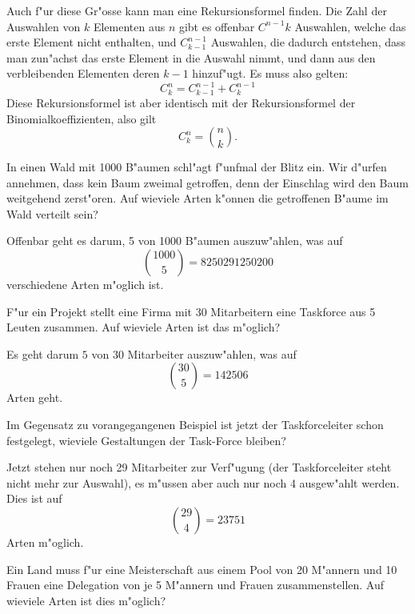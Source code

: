 Auch f"ur diese Gr"osse kann man eine Rekursionsformel finden.
Die Zahl der Auswahlen von $k$ Elementen aus $n$ gibt es
offenbar $C^{n-1}{k}$ Auswahlen, welche das erste Element nicht
enthalten, und $C^{n-1}_{k-1}$ Auswahlen, die dadurch entstehen,
dass man zun"achst das erste Element in die Auswahl nimmt, und dann
aus den verbleibenden Elementen deren $k-1$ hinzuf"ugt. Es muss also
gelten:
\[
C^n_k=C^{n-1}_{k-1}+C^{n-1}_{k}
\]
Diese Rekursionsformel ist aber identisch mit der Rekursionsformel
der Binomialkoeffizienten, also gilt
\[
C^n_k=\binom{n}{k}.
\]

\begin{beispiele}
\item In einen Wald mit 1000 B"aumen schl"agt f"unfmal der Blitz ein.
Wir d"urfen annehmen, dass kein Baum zweimal getroffen, denn der
Einschlag wird den Baum weitgehend zerst"oren. Auf wieviele Arten
k"onnen die getroffenen B"aume im Wald verteilt sein?

\begin{loesung}
Offenbar geht es darum, 5 von 1000 B"aumen auszuw"ahlen, was 
auf
\[
\binom{1000}{5}=8250291250200
\]
verschiedene Arten m"oglich ist.
\end{loesung}

\item F"ur ein Projekt stellt eine Firma mit 30 Mitarbeitern eine Taskforce
aus 5 Leuten zusammen. Auf wieviele Arten ist das m"oglich?


\begin{loesung}
Es geht darum $5$ von $30$ Mitarbeiter auszuw"ahlen, was auf
\[
\binom{30}{5}=142506
\]
Arten geht.
\end{loesung}

\item Im Gegensatz zu vorangegangenen Beispiel ist jetzt der
Taskforceleiter schon festgelegt, wieviele Gestaltungen der
Task-Force bleiben?

\begin{loesung}
Jetzt stehen nur noch 29 Mitarbeiter zur Verf"ugung (der Taskforceleiter
steht nicht mehr zur Auswahl), es m"ussen aber auch nur noch 4 ausgew"ahlt
werden. Dies ist auf
\[
\binom{29}{4}=23751
\]
Arten m"oglich.
\end{loesung}

\item\label{meisterschaft}
Ein Land muss f"ur eine Meisterschaft aus einem Pool von
20 M"annern und 10 Frauen eine Delegation von je 5 M"annern
und Frauen zusammenstellen. Auf wieviele Arten ist dies m"oglich?


\end{beispiele}
